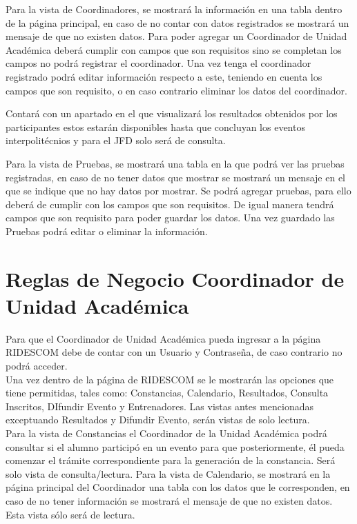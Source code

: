\noindent Para la vista de Coordinadores, se mostrará la información en una tabla dentro de la página principal, en caso de no contar con datos registrados se mostrará un mensaje de que no existen datos. Para poder agregar un Coordinador de Unidad Académica deberá cumplir con campos que son requisitos sino se completan los campos no podrá registrar el coordinador. Una vez tenga el coordinador registrado podrá editar información respecto a este, teniendo en cuenta los campos que son requisito, o en caso contrario eliminar los datos del coordinador.

\noindent Contará con un apartado en el que visualizará los resultados obtenidos por los participantes estos estarán disponibles hasta que concluyan los eventos interpolitécnios y para el JFD solo será de consulta.

\noindent Para la vista de Pruebas, se mostrará una tabla en la que podrá ver las pruebas registradas, en caso de no tener datos que mostrar se mostrará un mensaje en el que se indique que no hay datos por mostrar. Se podrá agregar pruebas, para ello deberá de cumplir con los campos que son requisitos. De igual manera tendrá campos que son requisito para poder guardar los datos. Una vez guardado las Pruebas podrá editar o eliminar la información.

\section{Reglas de Negocio Coordinador de Unidad Académica}
\noindent Para que el Coordinador de Unidad Académica pueda ingresar a la página RIDESCOM debe de contar con un Usuario y Contraseña, de caso contrario no podrá acceder.\\

\noindent Una vez dentro de la página de RIDESCOM se le mostrarán las opciones que tiene permitidas, tales como: Constancias, Calendario, Resultados, Consulta Inscritos, DIfundir Evento y Entrenadores. Las vistas antes mencionadas exceptuando Resultados y Difundir Evento, serán vistas de solo lectura.\\

\noindent Para la vista de Constancias el Coordinador de la Unidad Académica podrá consultar si el alumno participó en un evento para que posteriormente, él pueda comenzar el trámite correspondiente para la generación de la constancia. Será solo vista de consulta/lectura. Para la vista de Calendario, se mostrará en la página principal del Coordinador una tabla con los datos que le corresponden, en caso de no tener información se mostrará el mensaje de que no existen datos. Esta vista sólo será de lectura.\\

